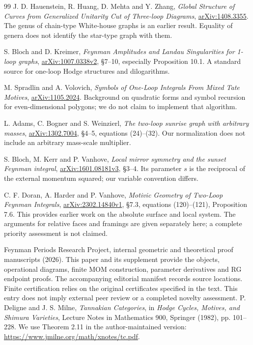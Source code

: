 \documentclass[11pt,a4paper,oneside]{article}
\theoremstyle{plain}
\theoremstyle{definition}
\theoremstyle{remark}
\numberwithin{equation}{section}
\begin{document}
\begin{thebibliography}{99}
J. D. Hauenstein, R. Huang, D. Mehta and Y. Zhang,
\emph{Global Structure of Curves from Generalized Unitarity Cut of Three-loop Diagrams},
\href{https://arxiv.org/abs/1408.3355}{arXiv:1408.3355}.
The genus of chain-type White-house graphs is an earlier result. Equality of genera does not identify the star-type graph with them.

S. Bloch and D. Kreimer,
\emph{Feynman Amplitudes and Landau Singularities for 1-loop graphs},
\href{https://arxiv.org/abs/1007.0338}{arXiv:1007.0338v2},
\S7--10, especially Proposition 10.1. A standard source for one-loop Hodge structures and dilogarithms.

M. Spradlin and A. Volovich,
\emph{Symbols of One-Loop Integrals From Mixed Tate Motives},
\href{https://arxiv.org/abs/1105.2024}{arXiv:1105.2024}.
Background on quadratic forms and symbol recursion for even-dimensional polygons; we do not claim to implement that algorithm.

L. Adams, C. Bogner and S. Weinzierl,
\emph{The two-loop sunrise graph with arbitrary masses},
\href{https://arxiv.org/abs/1302.7004}{arXiv:1302.7004},
\S4--5, equations (24)--(32). Our normalization does not include an arbitrary mass-scale multiplier.

S. Bloch, M. Kerr and P. Vanhove,
\emph{Local mirror symmetry and the sunset Feynman integral},
\href{https://arxiv.org/abs/1601.08181}{arXiv:1601.08181v3},
\S3--4. Its parameter $s$ is the reciprocal of the external momentum squared; our variable convention differs.

C. F. Doran, A. Harder and P. Vanhove,
\emph{Motivic Geometry of Two-Loop Feynman Integrals},
\href{https://arxiv.org/abs/2302.14840}{arXiv:2302.14840v1},
\S7.3, equations (120)--(121), Proposition 7.6.
This provides earlier work on the absolute surface and local system. The arguments for relative faces and framings are given separately here; a complete priority assessment is not claimed.

 Feynman Periods Research Project, internal geometric and theoretical proof manuscripts (2026). This paper and its supplement provide the objects, operational diagrams, finite MOM construction, parameter derivatives and RG endpoint proofs. The accompanying editorial manifest records source locations. Finite certification relies on the original certificates specified in the text. This entry does not imply external peer review or a completed novelty assessment.
P. Deligne and J. S. Milne,
\emph{Tannakian Categories}, in \emph{Hodge Cycles, Motives, and Shimura Varieties},
Lecture Notes in Mathematics 900, Springer (1982), pp. 101--228.
We use Theorem 2.11 in the author-maintained version:
\url{https://www.jmilne.org/math/xnotes/tc.pdf}.


\end{thebibliography}
\end{document}
